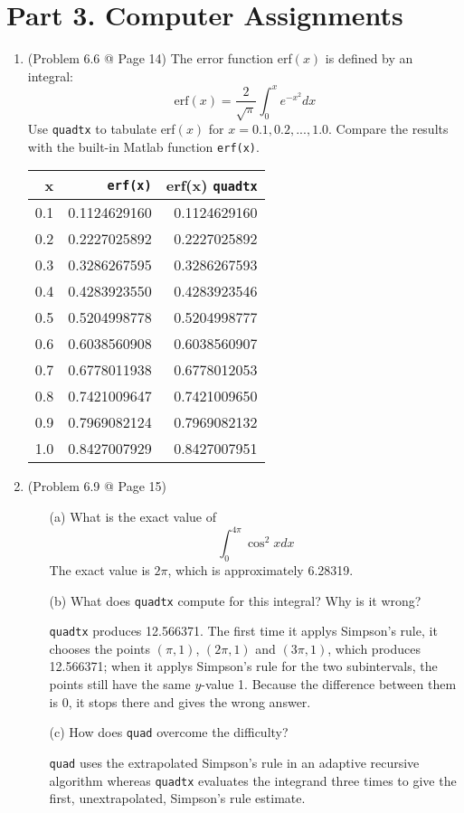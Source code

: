 \documentclass[10pt]{report}
\newcommand{\dintt}[4] {\int_{#1}^{#2} #3 d#4}
\begin{document}
\section*{Part 3. Computer Assignments}
\begin{enumerate}
	\item 
	(Problem 6.6 @ Page 14)  The error function erf$(x)$ is defined by an integral:
	\[
	\text{erf}(x) = \frac{2}{\sqrt{\pi}} \dintt{0}{x}{e^{-x^2}}{x}
	\]
	Use \texttt{quadtx} to tabulate erf$(x)$ for $x = 0.1, 0.2, . . . , 1.0$. Compare the results with the built-in Matlab function \texttt{erf(x)}.
	
	
	\begin{table}[H]
		\centering
		\begin{tabular}{*{3}{N}} 
			\toprule
			x & \texttt{erf(x)} & erf(x)  \texttt{quadtx} \\  & 0.1124629160 & 0.1124629160\\
			0.2 & 0.2227025892 & 0.2227025892\\
			0.3 & 0.3286267595 & 0.3286267593\\
			0.4 & 0.4283923550 & 0.4283923546\\
			0.5 & 0.5204998778 & 0.5204998777\\
			0.6 & 0.6038560908 & 0.6038560907\\
			0.7 & 0.6778011938 & 0.6778012053\\
			0.8 & 0.7421009647 & 0.7421009650\\
			0.9 & 0.7969082124 & 0.7969082132\\
			1.0 & 0.8427007929 & 0.8427007951\\
			\bottomrule
		\end{tabular}
	\end{table}
	
	\item 
	(Problem 6.9 @ Page 15)
	\begin{enumerate}
		\item [(a)]
		What is the exact value of
		\[
		\dintt{0}{4\pi}{\cos^2 x}{x}
		\]
		The exact value is $2\pi$, which is approximately 6.28319.
		
		\item [(b)]
		What does \texttt{quadtx} compute for this integral? Why is it wrong?
		
		\texttt{quadtx} produces 12.566371. The first time it applys Simpson's rule, it chooses the points $(\pi, 1)$, $(2\pi, 1)$ and $(3\pi, 1)$, which produces 12.566371; when it applys Simpson's rule for the two subintervals, the points still have the same $y$-value 1. Because the difference between them is 0, it stops there and gives the wrong answer.
		
		\item [(c)]
		How does \texttt{quad} overcome the difficulty?
		
		\texttt{quad} uses the extrapolated Simpson’s rule in an adaptive recursive algorithm whereas \texttt{quadtx} evaluates the integrand three times to
		give the first, unextrapolated, Simpson’s rule estimate.
	\end{enumerate}
\end{enumerate}
\end{document}
